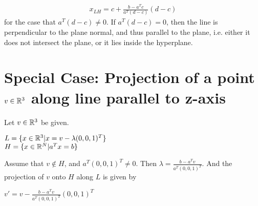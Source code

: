 \documentclass{article}
\begin{document}
\begin{equation}
        \begin{aligned}
                x_{LH} = c + \frac{b-a^Tc}{a^T(d-c)} (d-c)
        \end{aligned}
\end{equation}
for the case that $a^T(d-c)\neq 0$. If
$a^T(d-c)=0$, then the line is perpendicular to the plane normal, and thus
parallel to the plane, i.e. either it does not intersect the plane, or it lies
inside the hyperplane.

\section{Special Case: Projection of a point $v \in \mathbb{R}^3$ along line parallel to
z-axis}
Let $v \in \mathbb{R}^3$ be given. 
\begin{center}
     $L=\{x \in \mathbb{R}^3| x = v - \lambda (0,0,1)^T\}$\\
        $H=\{x\in \mathbb{R}^N| a^Tx=b\}$
\end{center}
Assume that $v \not\in H$, and $a^T(0,0,1)^T \neq 0$. Then $\lambda =
\frac{b-a^Tv}{a^T(0,0,1)^T}$. And the projection of $v$ onto $H$ along $L$ is
given by
\begin{center}
        $v' = v - \frac{b-a^Tv}{a^T(0,0,1)^T}(0,0,1)^T$
\end{center}
\end{document}
